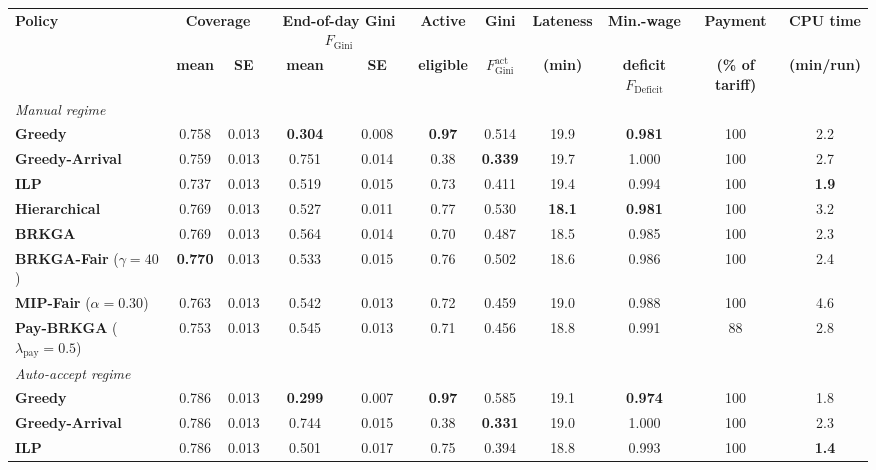 \documentclass[a4paper,11pt,review,3p,authoryear]{elsarticle}
\newcommand{\FG}{F_{\text{Gini}}}
\newcommand{\FGa}{F_{\text{Gini}}^{\text{act}}}
\newcommand{\FD}{F_{\text{Deficit}}}
\begin{document}
\begin{table}[htbp]
\centering
\setlength{\tabcolsep}{4pt}
\begin{adjustbox}{max width=\textwidth}
\begin{tabular}{l|cc|cc|c|c|c|c|c|c}
\hline
\multirow{2}{*}{\textbf{Policy}} & \multicolumn{2}{c|}{\textbf{Coverage}} & \multicolumn{2}{c|}{\textbf{End-of-day Gini $\FG$}} & \textbf{Active} & \textbf{Gini} & \textbf{Lateness} & \textbf{Min.-wage} & \textbf{Payment} & \textbf{CPU time} \\
 & \textbf{mean} & \textbf{SE} & \textbf{mean} & \textbf{SE} & \textbf{eligible} & $\FGa$ & \textbf{(min)} & \textbf{deficit $\FD$} & \textbf{(\% of tariff)} & \textbf{(min/run)} \\
\hline
\multicolumn{11}{l}{\textit{Manual regime}} \\
\textbf{Greedy} & 0.758 & 0.013 & \textbf{0.304} & 0.008 & \textbf{0.97} & 0.514 & 19.9 & \textbf{0.981} & 100 & 2.2 \\
\textbf{Greedy-Arrival} & 0.759 & 0.013 & 0.751 & 0.014 & 0.38 & \textbf{0.339} & 19.7 & 1.000 & 100 & 2.7 \\
\textbf{ILP} & 0.737 & 0.013 & 0.519 & 0.015 & 0.73 & 0.411 & 19.4 & 0.994 & 100 & \textbf{1.9} \\
\textbf{Hierarchical} & 0.769 & 0.013 & 0.527 & 0.011 & 0.77 & 0.530 & \textbf{18.1} & \textbf{0.981} & 100 & 3.2 \\
\textbf{BRKGA} & 0.769 & 0.013 & 0.564 & 0.014 & 0.70 & 0.487 & 18.5 & 0.985 & 100 & 2.3 \\
\hline
\textbf{BRKGA-Fair} ($\gamma = 40$) & \textbf{0.770} & 0.013 & 0.533 & 0.015 & 0.76 & 0.502 & 18.6 & 0.986 & 100 & 2.4 \\
\textbf{MIP-Fair} ($\alpha = 0.30$) & 0.763 & 0.013 & 0.542 & 0.013 & 0.72 & 0.459 & 19.0 & 0.988 & 100 & 4.6 \\
\textbf{Pay-BRKGA} ($\lambda_{\text{pay}} = 0.5$) & 0.753 & 0.013 & 0.545 & 0.013 & 0.71 & 0.456 & 18.8 & 0.991 & 88 & 2.8 \\
\hline
\multicolumn{11}{l}{\textit{Auto-accept regime}} \\
\textbf{Greedy} & 0.786 & 0.013 & \textbf{0.299} & 0.007 & \textbf{0.97} & 0.585 & 19.1 & \textbf{0.974} & 100 & 1.8 \\
\textbf{Greedy-Arrival} & 0.786 & 0.013 & 0.744 & 0.015 & 0.38 & \textbf{0.331} & 19.0 & 1.000 & 100 & 2.3 \\
\textbf{ILP} & 0.786 & 0.013 & 0.501 & 0.017 & 0.75 & 0.394 & 18.8 & 0.993 & 100 & \textbf{1.4} \\

\end{tabular}
\end{adjustbox}
\end{table}
\end{document}
